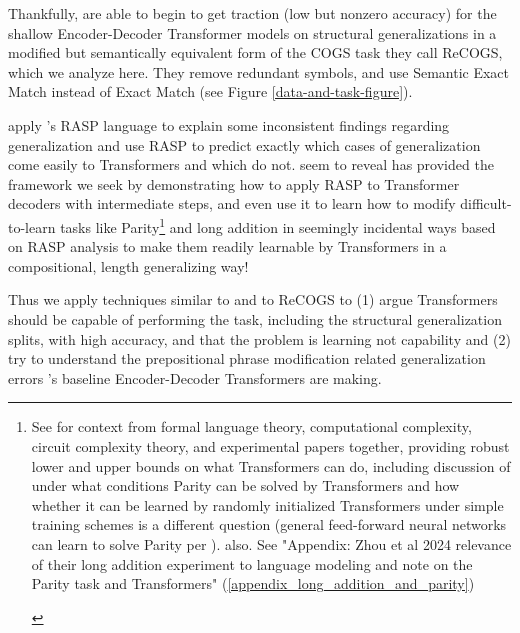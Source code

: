 \documentclass[11pt]{article}
\begin{document}
Thankfully, \cite{Wu2023} are able to begin to get traction (low but nonzero accuracy) for the shallow Encoder-Decoder Transformer models on structural generalizations in a modified but semantically equivalent form of the COGS task they call ReCOGS, which we analyze here. They remove redundant symbols, and use Semantic Exact Match instead of Exact Match (see Figure \ref{data-and-task-figure}).


\cite{Zhou2024} apply \cite{Weiss2021}'s RASP language to explain some inconsistent findings regarding generalization and use RASP to predict exactly which cases of generalization come easily to Transformers and which do not. \cite{Zhou2024} seem to reveal \cite{Weiss2021} has provided the framework we seek by demonstrating how to apply RASP to Transformer decoders with intermediate steps, and even use it to learn how to modify difficult-to-learn tasks like Parity\footnote{\begin{footnotesize}See \cite{Strobl2024} for context from formal language theory, computational complexity, circuit complexity theory, and experimental papers together, providing robust lower and upper bounds on what Transformers can do, including discussion of under what conditions Parity can be solved by Transformers and how whether it can be learned by randomly initialized Transformers under simple training schemes is a different question (general feed-forward neural networks can learn to solve Parity per \cite{10.7551/mitpress/4943.003.0128}). \cite{delétang2023neuralnetworkschomskyhierarchy} also. See "Appendix: Zhou et al 2024 relevance of their long addition experiment to language modeling and note on the Parity task and Transformers" (\ref{appendix_long_addition_and_parity})\end{footnotesize}} and long addition in seemingly incidental ways based on RASP analysis to make them readily learnable by Transformers in a compositional, length generalizing way!

Thus we apply techniques similar to \cite{Zhou2024} and \cite{Weiss2021} to ReCOGS to (1) argue Transformers should be capable of performing the task, including the structural generalization splits, with high accuracy, and that the problem is learning not capability and (2) try to understand the prepositional phrase modification related generalization errors \cite{Wu2023}'s baseline Encoder-Decoder Transformers are making.
\end{document}
